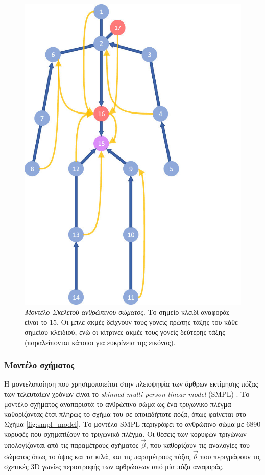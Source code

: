 \begin{figure}[h]
    \centering
    \includegraphics[scale=1.5]{images/chapter2/3d_pose_estimation/skeleton_human_model.jpg}
    \caption[Μοντέλο Σκελετού]{\textsl{Μοντέλο Σκελετού ανθρώπινου σώματος}. Το σημείο κλειδί αναφοράς είναι το 15. Οι μπλε ακμές δείχνουν τους γονείς πρώτης τάξης του κάθε σημείου κλειδιού, ενώ οι κίτρινες ακμές τους γονείς δεύτερης τάξης (παραλείπονται κάποιοι για ευκρίνεια της εικόνας).}
    \label{fig:skeleton_model}
\end{figure}
    
\subsubsection{Μοντέλο σχήματος}
\label{section:smpl_model}
Η μοντελοποίηση που χρησιμοποιείται στην πλειοψηφία των άρθρων εκτίμησης πόζας των τελευταίων χρόνων είναι το \textsl{skinned multi-person linear model} (SMPL) \cite{smpl_paper}. Το μοντέλο σχήματος αναπαριστά το ανθρώπινο σώμα ως ένα τριγωνικό πλέγμα καθορίζοντας έτσι πλήρως το σχήμα του σε οποιαδήποτε πόζα, όπως φαίνεται στο Σχήμα \ref{fig:smpl_model}. Το μοντέλο SMPL περιγράφει το ανθρώπινο σώμα με 6890 κορυφές που σχηματίζουν το τριγωνικό πλέγμα. Οι θέσεις των κορυφών τριγώνων υπολογίζονται από τις παραμέτρους σχήματος $\vec{\beta}$, που καθορίζουν τις αναλογίες του σώματος όπως το ύψος και τα κιλά, και τις παραμέτρους πόζας $\vec{\theta}$ που περιγράφουν τις σχετικές 3D γωνίες περιστροφής των αρθρώσεων από μία πόζα αναφοράς.
    
